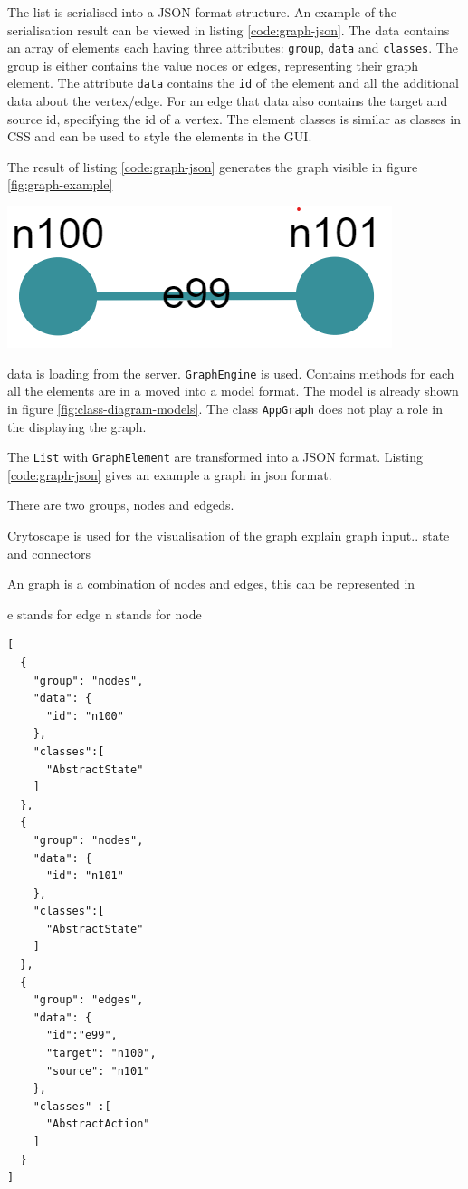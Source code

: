 The list is serialised into a JSON format structure. An example of the serialisation result can be viewed in listing \ref{code:graph-json}. The data contains an array of elements each having three attributes: \verb|group|, \verb|data| and \verb|classes|. The group is either contains the value nodes or edges, representing their graph element. The attribute \verb|data| contains the \verb|id| of the element and all the additional data about the vertex/edge. For an edge that data also contains the target and source id, specifying the id of a vertex. The element classes is similar as classes in \textsc{CSS} and can be used to style the elements in the GUI. 

The result of listing \ref{code:graph-json} generates the graph visible in figure \ref{fig:graph-example} 

\begingroup
\captionsetup{type=figure}
\includegraphics[scale=0.6]{content/5-Results/Images/graph-example.png}
\label{fig:graph-example}
\endgroup

data is loading from the server. \verb|GraphEngine| is used. Contains methods for each 
all the elements are in a moved into a model format. The model is already shown in figure \ref{fig:class-diagram-models}. The class \verb|AppGraph| does not play a role in the displaying the graph. 

The \verb|List| with \verb|GraphElement| are transformed into a JSON format. Listing \ref{code:graph-json} gives an example a graph in json format. 

There are two groups, nodes and edgeds. 

Crytoscape is used for the visualisation of the graph 
explain graph input.. state and connectors 

An graph is a combination of nodes and edges, this can be represented in

e stands for edge
n stands for node

\newpage
\begin{lstlisting}[language=xml, caption=Graph representation in JSON, label=code:graph-json]
[
  {
    "group": "nodes",
    "data": {
      "id": "n100" 
    },
    "classes":[
      "AbstractState"
    ]
  },
  {
    "group": "nodes",
    "data": {
      "id": "n101"
    },
    "classes":[
      "AbstractState"
    ]
  },
  {
    "group": "edges",
    "data": {
      "id":"e99",
      "target": "n100",
      "source": "n101"
    },
    "classes" :[
      "AbstractAction"
    ]
  }
]
\end{lstlisting}

